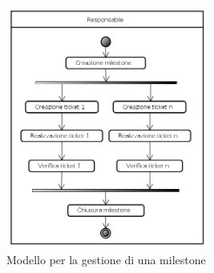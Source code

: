 \begin{figure}[!h]
	\centering
	\includegraphics[height=8cm]{./content/Immagini/Avanzamento_Milestone.png}
	\caption{Modello per la gestione di una milestone}
	\label{gestione_milestone}
\end{figure}
